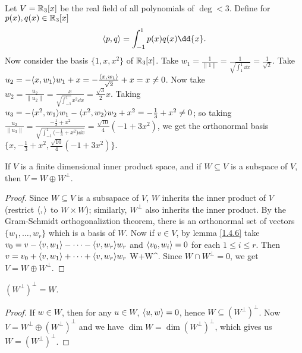 \begin{example}
    Let $V=\mathbb{R}_3[x]$ be the real field of all polynomials of $\deg<3$. Define for
    $p(x),q(x) \in \mathbb{R}_3[x]$
        \begin{equation*}
            \vbrack{p,q}=\int_{-1}^1{p(x)q(x)} \dd{x}.
        \end{equation*}
    Now consider the basis $\{1,x,x^2\}$ of $\mathbb{R}_3[x]$. Take
    $w_1=\frac{1}{\|1\|}=\frac{1}{\sqrt{\int_{1}^1 \dd{x}}}=\frac{1}{\sqrt{2}}$. Take
    $u_2=-\langle x,w_1\rangle w_1+x=-\frac{\langle x,w_1\rangle}{\sqrt{2}}+x=x \neq 0$. Now take
    $w_2=\frac{u_2}{\|u_2\|}=\frac{x}{\sqrt{\int_{-1}^1}{x^2} \dd{x}}=\frac{\sqrt{3}}{2}x$. Taking
    $u_3=-\langle x^2,w_1\rangle w_1-\langle x^2,w_2\rangle w_2+x^2=-\frac{1}{3}+x^2 \neq 0$; so taking
    $\frac{u_2}{\|u_3\|}=\frac{-\frac{1}{3}+x^2}{\sqrt{\int_{-1}^1{(-\frac{1}{3}+x^2})
    \dd{x}}}=\frac{\sqrt{10}}{4}(-1+3x^2)$, we get the orthonormal basis
    $\{x,-\frac{1}{3}+x^2,\frac{\sqrt{10}}{4}(-1+3x^2)\}$.
\end{example} 

\begin{theorem}
    If $V$ is a finite dimensional inner product space, and if  $W \subseteq V$ is a subspace of
    $V$, then  $V=W \oplus W^\perp$.
\end{theorem}
\begin{proof}
    Since $W \subseteq V$ is a subsapace of  $V$,  $W$ inherits the inner product of  $V$ (restrict
    $\langle ,\rangle$ to $W \times W$); similarly, $W^\perp$ also inherits the inner product. By the
    Gram-Schmidt orthogonaliztion theorem, there is an orthonormal set of vectors $\{w_1, \dots,
    w_r\}$ which is a basis of $W$. Now if  $v \in V$, by lemma \ref {1.4.6} take
    $v_0=v-\langle v,w_1\rangle-\dots-\langle v,w_r\rangle w_r$ and $\langle v_0,w_i\rangle=0$ for each $1 \leq i \leq
    r$. Then  $v=v_0+\langle v,w_1\rangle+\dots+\langle v,w_r\rangle w_r$ \in W+W^\perp. Since $W \cap
    W^\perp=0$, we get  $V=W \oplus W^\perp$.
\end{proof}
\begin{corollary}
    $(W^\perp)^\perp=W$.
\end{corollary}
\begin{proof}
    If $w \in W$, then for any  $u \in W$,  $\langle u,w\rangle=0$, hence $W \subseteq (W^\perp)^\perp$.
    Now $V=W^\perp \oplus (W^\perp)^\perp$ and we have $\dim{W}=\dim{(W^\perp)^\perp}$, which gives
    us $W=(W^\perp)^\perp$.
\end{proof}
